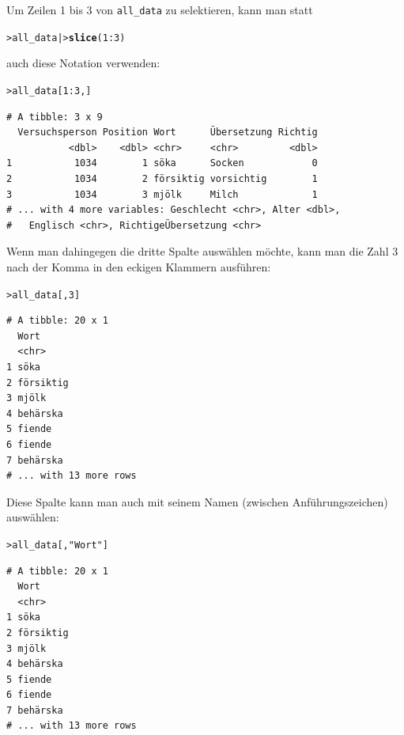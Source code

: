 \documentclass[oneside, 10pt]{book}\usepackage[]{graphicx}\usepackage[]{xcolor}
\makeatletter
\newcommand{\hlnum}[1]{\textcolor[rgb]{0.686,0.059,0.569}{#1}}%
\newcommand{\hlstr}[1]{\textcolor[rgb]{0.192,0.494,0.8}{#1}}%
\newcommand{\hlopt}[1]{\textcolor[rgb]{0,0,0}{#1}}%
\newcommand{\hlstd}[1]{\textcolor[rgb]{0.345,0.345,0.345}{#1}}%
\newcommand{\hlkwd}[1]{\textcolor[rgb]{0.737,0.353,0.396}{\textbf{#1}}}%
\newenvironment{kframe}{%
 \def\at@end@of@kframe{}%
 \ifinner\ifhmode%
  \def\at@end@of@kframe{\end{minipage}}%
  \begin{minipage}{\columnwidth}%
 \fi\fi%
 \def\FrameCommand##1{\hskip\@totalleftmargin \hskip-\fboxsep
 \colorbox{shadecolor}{##1}\hskip-\fboxsep
     \hskip-\linewidth \hskip-\@totalleftmargin \hskip\columnwidth}%
 \MakeFramed {\advance\hsize-\width
   \@totalleftmargin\z@ \linewidth\hsize
   \@setminipage}}%
 {\par\unskip\endMakeFramed%
 \at@end@of@kframe}
\newenvironment{knitrout}{}{} %
\makeatother
\begin{document}
Um Zeilen 1 bis 3 von \texttt{all\_data} zu selektieren, kann
man statt
\begin{knitrout}
\color{fgcolor}\begin{kframe}
\begin{alltt}
\hlstd{> }\hlstd{all_data |>} \hlkwd{slice}\hlstd{(}\hlnum{1}\hlopt{:}\hlnum{3}\hlstd{)}
\end{alltt}
\end{kframe}
\end{knitrout}
auch diese Notation verwenden:
\begin{knitrout}
\color{fgcolor}\begin{kframe}
\begin{alltt}
\hlstd{> }\hlstd{all_data[}\hlnum{1}\hlopt{:}\hlnum{3}\hlstd{, ]}
\end{alltt}
\begin{verbatim}
# A tibble: 3 x 9
  Versuchsperson Position Wort      Übersetzung Richtig
           <dbl>    <dbl> <chr>     <chr>         <dbl>
1           1034        1 söka      Socken            0
2           1034        2 försiktig vorsichtig        1
3           1034        3 mjölk     Milch             1
# ... with 4 more variables: Geschlecht <chr>, Alter <dbl>,
#   Englisch <chr>, RichtigeÜbersetzung <chr>
\end{verbatim}
\end{kframe}
\end{knitrout}
Wenn man dahingegen die dritte Spalte auswählen möchte,
kann man die Zahl 3 nach der Komma in den eckigen Klammern ausführen:
\begin{knitrout}
\color{fgcolor}\begin{kframe}
\begin{alltt}
\hlstd{> }\hlstd{all_data[,} \hlnum{3}\hlstd{]}
\end{alltt}
\begin{verbatim}
# A tibble: 20 x 1
  Wort     
  <chr>    
1 söka     
2 försiktig
3 mjölk    
4 behärska 
5 fiende   
6 fiende   
7 behärska 
# ... with 13 more rows
\end{verbatim}
\end{kframe}
\end{knitrout}
Diese Spalte kann man auch mit seinem Namen (zwischen Anführungszeichen)
auswählen:
\begin{knitrout}
\color{fgcolor}\begin{kframe}
\begin{alltt}
\hlstd{> }\hlstd{all_data[,} \hlstr{"Wort"}\hlstd{]}
\end{alltt}
\begin{verbatim}
# A tibble: 20 x 1
  Wort     
  <chr>    
1 söka     
2 försiktig
3 mjölk    
4 behärska 
5 fiende   
6 fiende   
7 behärska 
# ... with 13 more rows
\end{verbatim}
\end{kframe}
\end{knitrout}
\end{document}
